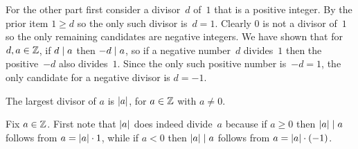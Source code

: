 \documentclass{test}  %
\begin{document}
\begin{problem}
\begin{exes}
\begin{answer}
  For the other part 
  first consider a divisor~$d$ of~$1$ that is a positive integer.
  By the prior item $1\geq d$ so the only such divisor is~$d=1$.
  Clearly $0$ is not a divisor of~$1$ so the only remaining candidates
  are negative integers.
  We have shown that for $d,a\in\mathbb{Z}$, if $d\mid a$ then $-d\mid a$,
  so if a negative number~$d$ divides~$1$ then the positive~$-d$ 
  also divides~$1$.
  Since the only such positive number is~$-d=1$, the only 
  candidate for a negative divisor is $d=-1$. 
\end{answer}
\begin{exercise}
  The largest divisor of $a$ is $\lvert a\rvert$, for $a\in\mathbb{Z}$ with $a\neq 0$.
\end{exercise}
\begin{answer}
  Fix $a\in\mathbb{Z}$. 
  First note that $\lvert a\rvert$ does indeed divide~$a$ because
  if $a\geq 0$ then $\lvert a\rvert\mid a$ follows from 
  $a=\lvert a\rvert\cdot 1$,
  while if $a<0$ then $\lvert a\rvert\mid a$ follows from 
  $a=\lvert a\rvert\cdot(-1)$.


\end{answer}
\end{exes}
\end{problem}
\end{document}
